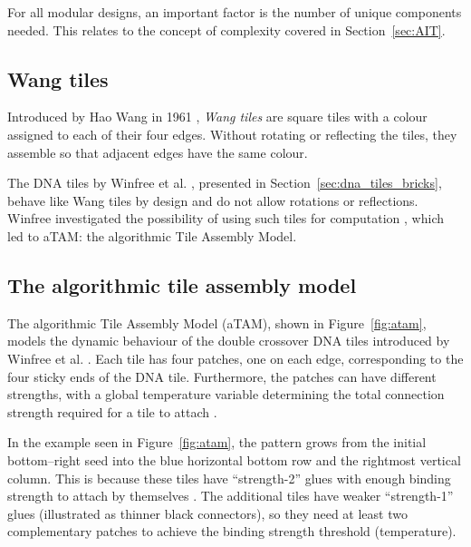 For all modular designs, an important factor is the number of unique components needed. This relates to the concept of complexity covered in Section~\ref{sec:AIT}.

\subsection{Wang tiles}
Introduced by Hao Wang in 1961 \cite{wang1961proving}, \emph{Wang tiles} are square tiles with a colour assigned to each of their four edges. Without rotating or reflecting the tiles, they assemble so that adjacent edges have the same colour.


The DNA tiles by Winfree et al. \cite{winfree1998design}, presented in Section~\ref{sec:dna_tiles_bricks}, behave like Wang tiles by design and do not allow rotations or reflections. Winfree investigated the possibility of using such tiles for computation \cite{winfree1998algorithmic}, which led to aTAM: the algorithmic Tile Assembly Model.

\subsection{The algorithmic tile assembly model}
\label{sec:atam}


The algorithmic Tile Assembly Model (aTAM), shown in Figure~\ref{fig:atam}, models the dynamic behaviour of the double crossover DNA tiles introduced by Winfree et al. \cite{winfree1998design}. Each tile has four patches, one on each edge, corresponding to the four sticky ends of the DNA tile. Furthermore, the patches can have different strengths, with a global temperature variable determining the total connection strength required for a tile to attach \cite{doty2012theory}.

In the example seen in Figure~\ref{fig:atam}, the pattern grows from the initial bottom--right seed into the blue horizontal bottom row and the rightmost vertical column. This is because these tiles have ``strength-2'' glues with enough binding strength to attach by themselves \cite{doty2012theory}. The additional tiles have weaker ``strength-1'' glues (illustrated as thinner black connectors), so they need at least two complementary patches to achieve the binding strength threshold (temperature).

